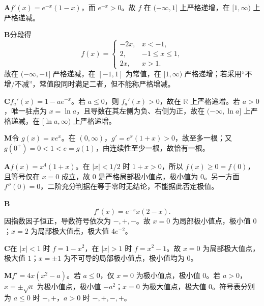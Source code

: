 \begin{solutionBox}
\textbf{A}\quad \(f'(x)=e^{-x}(1-x)\)，而 \(e^{-x}>0\)。故 \(f\) 在 \((-\infty,1]\) 上严格递增，在 \([1,\infty)\) 上严格递减。

\textbf{B}\quad 分段得
\[
f(x)=\begin{cases}-2x,&x<-1,\\2,&-1\le x\le1,\\2x,&x>1.\end{cases}
\]
故在 \((-\infty,-1]\) 严格递减，在 \([-1,1]\) 为常值，在 \([1,\infty)\) 严格递增；若采用“不增/不减”，常值段同时满足二者，但不能称严格增减。

\textbf{C}\quad \(f_a'(x)=1-ae^{-x}\)。若 \(a\le0\)，则 \(f_a'(x)>0\)，故在 \(\mathbb R\) 上严格递增。若 \(a>0\)，唯一驻点为 \(x=\ln a\)，且导数在其左侧为负、右侧为正，故在 \((-\infty,\ln a]\) 上严格递减，在 \([\ln a,\infty)\) 上严格递增。

\textbf{M}\quad 令 \(g(x)=xe^x\)。在 \((0,\infty)\)，\(g'=e^x(1+x)>0\)，故至多一根；又 \(g(0^+)=0<1<e=g(1)\)，由连续性至少一根，故恰有一根。
\end{solutionBox}

\begin{solutionBox}
\textbf{A}\quad \(f(x)=x^4(1+x)\)。在 \(|x|<1/2\) 时 \(1+x>0\)，所以 \(f(x)\ge0=f(0)\)，且等号仅在 \(x=0\) 成立，故 \(0\) 是严格局部极小值点，极小值为 \(0\)。另一方面 \(f''(0)=0\)，二阶充分判据在等于零时无结论，不能据此否定极值。

\textbf{B}\quad
\[
f'(x)=e^{-x}x(2-x).
\]
因指数因子恒正，导数符号依次为 \(-,+,-\)。故 \(x=0\) 为局部极小值点，极小值 \(0\)；\(x=2\) 为局部极大值点，极大值 \(4e^{-2}\)。

\textbf{C}\quad 在 \(|x|<1\) 时 \(f=1-x^2\)，在 \(|x|>1\) 时 \(f=x^2-1\)。故 \(x=0\) 为局部极大值点，极大值 \(1\)；\(x=\pm1\) 为不可导的局部极小值点，极小值均为 \(0\)。

\textbf{M}\quad \(f'=4x(x^2-a)\)。若 \(a\le0\)，仅 \(x=0\) 为极小值点，极小值 \(0\)。若 \(a>0\)，\(x=\pm\sqrt a\) 为极小值点，极小值 \(-a^2\)；\(x=0\) 为极大值点，极大值 \(0\)。符号表分别为 \(a\le0\) 时 \(-,+\)，\(a>0\) 时 \(-,+,-,+\)。
\end{solutionBox}

